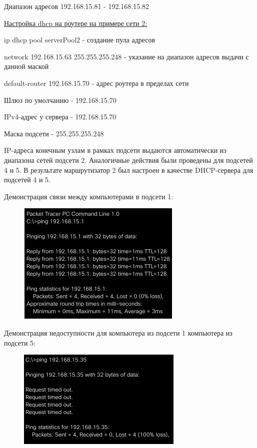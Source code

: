 \documentclass[a4paper,14pt]{extreport} %
\begin{document}
Диапазон адресов 192.168.15.81 - 192.168.15.82

\underline{Настройка dhcp на роутере на примере сети 2:}

ip dhcp pool serverPool2 - создание пула адресов

network 192.168.15.63 255.255.255.248 - указание на диапазон адресов выдачи с данной маской

default-router 192.168.15.70 - адрес роутера в пределах сети

Шлюз по умолчанию - 192.168.15.70

IPv4-адрес у сервера - 192.168.15.70

Маска подсети - 255.255.255.248

IP-адреса конечным узлам в рамках подсети выдаются
автоматически из диапазона сетей подсети 2.
Аналогичные действия были проведены для подсетей 4 и 5. В результате маршрутизатор 2 был настроен в качестве DHCP-сервера
для подсетей 4 и 5.

Демонстрация связи между компьютерами в подсети 1:

\begin{figure}[H]
	\centering
	\includegraphics[width=0.7\linewidth]{1}
	\caption{}
	\label{fig:1}
\end{figure}

Демонстрация недоступности для компьютера из подсети 1 компьютера из подсети 5:
\begin{figure}[H]
	\centering
	\includegraphics[width=0.7\linewidth]{2}
	\caption{}
	\label{fig:2}
\end{figure}
\end{document}

